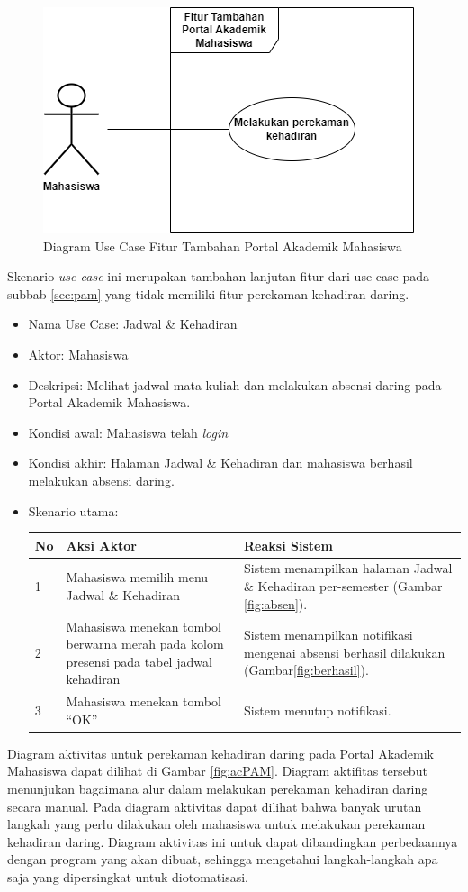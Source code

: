 \begin{figure}[H]
	\centering
	\includegraphics[scale=0.6]{Gambar/usecase2020.png}
	\caption{Diagram Use Case Fitur Tambahan Portal Akademik Mahasiswa} 
	\label{fig:usecase2020}
\end{figure}
Skenario \textit{use case} ini merupakan tambahan lanjutan fitur dari use case pada subbab \ref{sec:pam} yang tidak memiliki fitur perekaman kehadiran daring. 
\begin{itemize}
	\item Nama Use Case: Jadwal \& Kehadiran
	\item Aktor: Mahasiswa
	\item Deskripsi: Melihat jadwal mata kuliah dan melakukan absensi daring pada Portal Akademik Mahasiswa. 
	\item Kondisi awal: Mahasiswa telah \textit{login}
	\item Kondisi akhir: Halaman Jadwal \& Kehadiran dan mahasiswa berhasil melakukan absensi daring.
	\item Skenario utama:
	\begin{table}[h!]
		\centering
		\label{}
		\begin{tabular}{ | m{0.5cm} | m{7cm}| m{6cm} | } 
			\hline
			No & Aksi Aktor & Reaksi Sistem \\ 
			\hline
			1 & Mahasiswa memilih menu Jadwal \& Kehadiran & Sistem menampilkan halaman Jadwal \& Kehadiran per-semester (Gambar \ref{fig:absen}).
			\\ 
			\hline
			2 & Mahasiswa menekan tombol berwarna merah pada kolom presensi pada tabel jadwal kehadiran & Sistem menampilkan notifikasi mengenai absensi berhasil dilakukan (Gambar\ref{fig:berhasil}).
			\\ 
			\hline
			3 & Mahasiswa menekan tombol ``OK'' & Sistem menutup notifikasi.
			\\ 
			\hline
		\end{tabular}
	\end{table}	
\end{itemize}
Diagram aktivitas untuk perekaman kehadiran daring pada Portal Akademik Mahasiswa dapat dilihat di Gambar \ref{fig:acPAM}. Diagram aktifitas tersebut menunjukan bagaimana alur dalam melakukan perekaman kehadiran daring secara manual. Pada diagram aktivitas dapat dilihat bahwa banyak urutan langkah yang perlu dilakukan oleh mahasiswa untuk melakukan perekaman kehadiran daring. Diagram aktivitas ini untuk dapat dibandingkan perbedaannya dengan program yang akan dibuat, sehingga mengetahui langkah-langkah apa saja yang dipersingkat untuk diotomatisasi.

